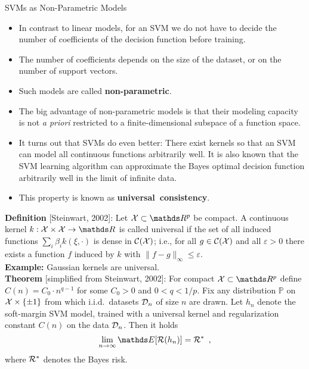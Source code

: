 \begin{vbframe}{SVMs as Non-Parametric Models}

  \begin{itemize}
    \item In contrast to linear models, for an SVM
    we do not have to decide the number of coefficients of the
    decision function before training.
    \item The number of coefficients depends on the
    size of the dataset, or on the number of support vectors.
    \item Such models are called \textbf{non-parametric}.
    \item The big advantage of non-parametric models is that their
    modeling capacity is not \textit{a priori} restricted
    to a finite-dimensional subspace of a function space.
    \item It turns out that SVMs do even better: There exist kernels so
    that an SVM can model all continuous functions arbitrarily well.
    It is also known that the SVM learning algorithm can approximate the Bayes optimal decision
    function arbitrarily well in the limit of infinite data.
    \item This property is known as \textbf{universal~consistency}.
  \end{itemize}

  \framebreak

  \textbf{Definition} [Steinwart, 2002]:
  Let $\Xspace \subset \R^p$ be compact. A continuous kernel
  $k : \Xspace \times \Xspace \to \R$ is called universal if the set of all
  induced functions $\sum_i \beta_i k\left(\xi, \cdot\right)$ is dense in
  $\mathcal{C}(\mathcal{X})$; i.e., for all $g \in \mathcal{C}(\mathcal{X})$ and all
  $\varepsilon > 0$ there exists a function $f$ induced by $k$ with
  $\|f-g\|_\infty \leq \varepsilon$.\\[1em]

  \textbf{Example:} Gaussian kernels are universal.\\[1em]

  \textbf{Theorem} [simplified from Steinwart, 2002]:
  For compact $\Xspace \subset \R^p$ define $C(n) = C_0 \cdot n^{q - 1}$
  for some $C_0 > 0$ and $0 < q < 1/p$. Fix any distribution $\mathbb{P}$ on
  $\mathcal{X} \times \{\pm 1\}$ from which i.i.d.\ datasets $\mathcal{D}_n$ of size
  $n$ are drawn. Let $h_n$ denote the soft-margin SVM model,
  trained with a universal kernel and regularization constant $C(n)$
  on the data $\mathcal{D}_n$. Then it holds
  $$
    \lim_{n \to \infty} \E[\risk(h_n)] = \risk^*
    \enspace,
  $$
  where $\mathcal{R}^*$ denotes the Bayes risk.

\end{vbframe}

